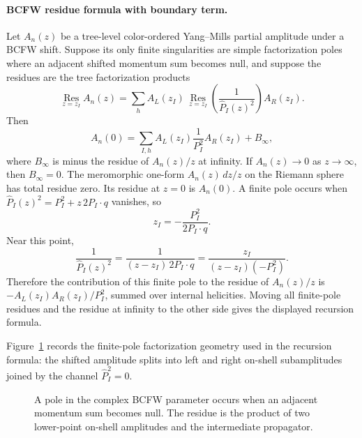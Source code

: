 \paragraph{BCFW residue formula with boundary term.}
  Let \(A_n(z)\) be a tree-level color-ordered Yang--Mills partial amplitude
  under a BCFW shift.  Suppose its only finite singularities are simple
  factorization poles where an adjacent shifted momentum sum becomes null, and
  suppose the residues are the tree factorization products
  \[
    \operatorname*{Res}_{z=z_I} A_n(z)
    =
    \sum_h
    A_L(z_I)\,
    \operatorname*{Res}_{z=z_I}\!\left(\frac1{\widehat P_I(z)^2}\right)
    A_R(z_I).
  \]
  Then
  \[
    A_n(0)
    =
    \sum_{I,h}A_L(z_I)\frac1{P_I^2}A_R(z_I)+B_\infty,
  \]
  where \(B_\infty\) is minus the residue of \(A_n(z)/z\) at infinity.  If
  \(A_n(z)\to0\) as \(z\to\infty\), then \(B_\infty=0\).
The meromorphic one-form \(A_n(z)\,dz/z\) on the Riemann sphere has total
residue zero.  Its residue at \(z=0\) is \(A_n(0)\).  A finite pole occurs
when \(\widehat P_I(z)^2=P_I^2+z\,2P_I\cdot q\) vanishes, so
\[
  z_I=-\frac{P_I^2}{2P_I\cdot q}.
\]
Near this point,
\[
  \frac1{\widehat P_I(z)^2}
  =
  \frac1{(z-z_I)\,2P_I\cdot q}
  =
  \frac{z_I}{(z-z_I)(-P_I^2)} .
\]
Therefore the contribution of this finite pole to the residue of \(A_n(z)/z\)
is
\(-A_L(z_I)A_R(z_I)/P_I^2\), summed over internal helicities.  Moving all
finite-pole residues and the residue at infinity to the other side gives the
displayed recursion formula.

Figure~\ref{fig:bcfw-factorization} records the finite-pole factorization
geometry used in the recursion formula: the shifted amplitude splits into left
and right on-shell subamplitudes joined by the channel \(\widehat P_I^2=0\).

\begin{figure}[H]
  \centering
  \caption{A pole in the complex BCFW parameter occurs when an adjacent
  momentum sum becomes null.  The residue is the product of two lower-point
  on-shell amplitudes and the intermediate propagator.}
  \label{fig:bcfw-factorization}
\end{figure}

